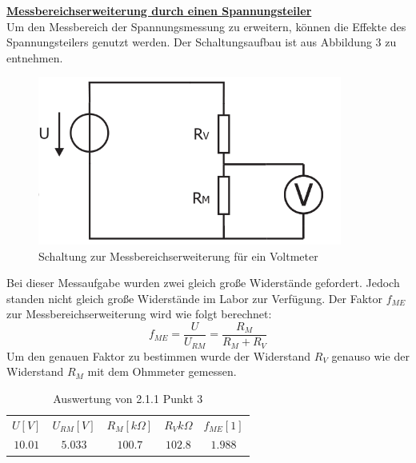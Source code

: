 \documentclass[a4paper,12pt]{article}
\begin{document}
	\newpage
	\noindent
	\underline{\textbf{Messbereichserweiterung durch einen Spannungsteiler}}\\
	\newline
	\noindent
	Um den Messbereich der Spannungsmessung zu erweitern, können die Effekte des Spannungsteilers genutzt werden. Der Schaltungsaufbau ist aus Abbildung 3 zu entnehmen.
	\begin{figure}[h]
		\centering
		\includegraphics[width=10cm]{img/Messbereich_Voltmeter}
		\caption{Schaltung zur Messbereichserweiterung für ein Voltmeter}
	\end{figure}
	\newline
	Bei dieser Messaufgabe wurden zwei gleich große Widerstände gefordert.
	Jedoch standen nicht gleich große Widerstände im Labor zur Verfügung. Der Faktor $f_{ME}$ zur Messbereichserweiterung wird wie folgt berechnet:
	\[
		f_{ME} = \frac{U}{U_{RM}} = \frac{R_M}{R_M + R_V}
	\]
	\newline
	Um den genauen Faktor zu bestimmen wurde der Widerstand $R_V$ genauso wie der Widerstand $R_M$ mit dem Ohmmeter gemessen.
	\begin{table}[h]
		\centering
		\begin{tabular}{|c|c|c|c|c|}
			\hline
			\multirow{2}{*}{$U[V]$} & \multirow{2}{*}{$U_{RM}[V]$} & \multirow{2}{*}{$R_M[k\Omega]$} & \multirow{2}{*}{$R_V{k\Omega}$} & \multirow{2}{*}{$f_{ME}[1]$} \\
			&  &  &  &  \\ \hline
			\multirow{2}{*}{$10.01$} & \multirow{2}{*}{$5.033$} & \multirow{2}{*}{$100.7$} & \multirow{2}{*}{$102.8$} & \multirow{2}{*}{$1.988$} \\
			&  &  &  &  \\ \hline
		\end{tabular}
		\caption{Auswertung von 2.1.1 Punkt 3}
	\end{table}
	\newpage
\end{document}
